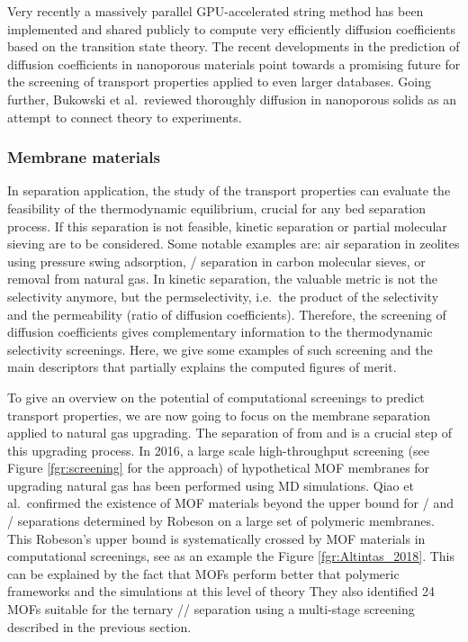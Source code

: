 \documentclass[main.tex]{subfiles}
\begin{document}
Very recently a massively parallel GPU-accelerated string method has been implemented and shared publicly to compute very efficiently diffusion coefficients {based on the transition state theory}.\cite{Zhou_2021} The recent developments in the prediction of diffusion coefficients in nanoporous materials point towards a promising future for the screening of transport properties applied to even larger databases. Going further, Bukowski et al.\ reviewed thoroughly diffusion in nanoporous solids as an attempt to connect theory to experiments.\cite{Bukowski_2021}

\subsubsection{Membrane materials}

In separation application, the study of the transport properties can evaluate the feasibility of the thermodynamic equilibrium, crucial for any bed separation process. If this separation is not feasible, kinetic separation or partial molecular sieving are to be considered. Some notable examples are: air separation in zeolites using pressure swing adsorption,\cite{ruthven1990air} / separation in carbon molecular sieves,\cite{Reid_1999} or  removal from natural gas.\cite{Wang_2019} In kinetic separation, the valuable metric is not the selectivity anymore, but the permselectivity, i.e.\ the product of the selectivity and the permeability (ratio of diffusion coefficients). Therefore, the screening of diffusion coefficients gives complementary information to the thermodynamic selectivity screenings. Here, we give some examples of such screening and the main descriptors that partially explains the computed figures of merit.

To give an overview on the potential of computational screenings to predict transport properties, we are now going to focus on the membrane separation applied to natural gas upgrading. The separation of  from  and  is a crucial step of this upgrading process.
In 2016, a large scale high-throughput screening (see Figure \ref{fgr:screening} for the approach) of hypothetical MOF membranes for upgrading natural gas has been performed using MD simulations.\cite{Qiao_2016} Qiao et al.\ confirmed the existence of MOF materials beyond the upper bound for / and / separations determined by Robeson on a large set of polymeric membranes.\cite{robeson1991correlation} This Robeson's upper bound is systematically crossed by MOF materials in computational screenings, see as an example the Figure \ref{fgr:Altintas_2018}. This can be explained by the fact that MOFs perform better that polymeric frameworks and the simulations at this level of theory  They also identified 24 MOFs suitable for the ternary // separation using a multi-stage screening described in the previous section.
\end{document}
